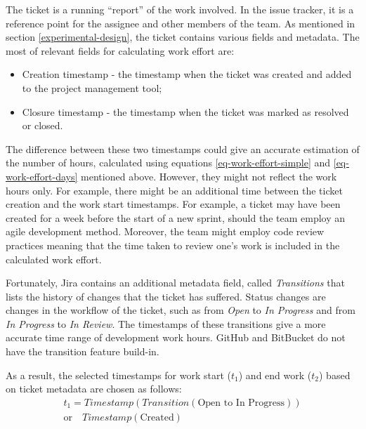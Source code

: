 \documentclass{mpaper}
\begin{document}
The ticket is a running ``report'' of the work involved. In the issue tracker,
it is a reference point for the assignee and other members of the team. As
mentioned in section \ref{experimental-design}, the ticket contains various
fields and metadata. The most of relevant fields for calculating work effort are:

\begin{itemize}
  \item Creation timestamp - the timestamp when the ticket was created and added
  to the project management tool;
  \item Closure timestamp - the timestamp when the ticket was marked as resolved
  or closed.  
\end{itemize}

The difference between these two timestamps could give an accurate estimation of
the number of hours, calculated using equations \ref{eq-work-effort-simple} and
\ref{eq-work-effort-days} mentioned above. However, they might not reflect the
work hours only. For example, there might be an additional time between the
ticket creation and the work start timestamps. For example, a ticket may have
been created for a week before the start of a new sprint, should the team employ
an agile development method. Moreover, the team might employ code review
practices meaning that the time taken to review one's work is included in the
calculated work effort. 

Fortunately, Jira contains an additional metadata field, called
\emph{Transitions} that lists the history of changes that the ticket has
suffered. Status changes are changes in the workflow of the ticket, such as from
\emph{Open} to \emph{In Progress} and from \emph{In Progress} to \emph{In
Review}. The timestamps of these transitions give a more accurate time range of
development work hours. GitHub and BitBucket do not have the transition feature
build-in.

As a result, the selected timestamps for work start ($t_{1}$) and end work
($t_{2}$) based on ticket metadata are chosen as follows:
\begin{equation}
  \label{eq-ticket-start}
  \begin{aligned}
    t_{1} = Timestamp(Transition(\textrm{Open to In Progress})) \\ 
      \textrm{or} \quad Timestamp(\textrm{Created}) \\
  \end{aligned}
\end{equation}
\end{document}
